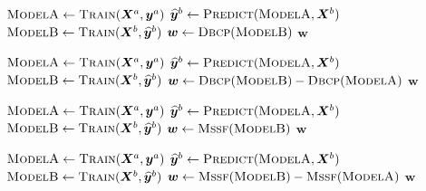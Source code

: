 \documentclass{article}
\begin{document}
\begin{algorithm}
	\caption{}
	\begin{algorithmic}[1]
		\State $\textsc{ModelA} \gets \Call{Train}{\bm{X}^a,\bm{y}^a}$
		\State $\widehat{\bm{y}}^b \gets \Call{Predict}{\textsc{ModelA},\bm{X}^b}$
		\State $\textsc{ModelB} \gets \Call{Train}{\bm{X}^b,\widehat{\bm{y}}^b}$
		\State $\bm{w} \gets \Call{Dbcp}{\textsc{ModelB}}$
		\State \Return $\bm{w}$
		\EndFunction
	\end{algorithmic}
\end{algorithm}

\begin{algorithm}
	\caption{}
	\begin{algorithmic}[1]
		\State $\textsc{ModelA} \gets \Call{Train}{\bm{X}^a,\bm{y}^a}$
		\State $\widehat{\bm{y}}^b \gets \Call{Predict}{\textsc{ModelA},\bm{X}^b}$
		\State $\textsc{ModelB} \gets \Call{Train}{\bm{X}^b,\widehat{\bm{y}}^b}$
		\State $\bm{w} \gets \Call{Dbcp}{\textsc{ModelB}} - \Call{Dbcp}{\textsc{ModelA}}$
		\State \Return $\bm{w}$
		\EndFunction
	\end{algorithmic}
\end{algorithm}

\begin{algorithm}
	\caption{}
	\begin{algorithmic}[1]
		\State $\textsc{ModelA} \gets \Call{Train}{\bm{X}^a,\bm{y}^a}$
		\State $\widehat{\bm{y}}^b \gets \Call{Predict}{\textsc{ModelA},\bm{X}^b}$
		\State $\textsc{ModelB} \gets \Call{Train}{\bm{X}^b,\widehat{\bm{y}}^b}$
		\State $\bm{w} \gets \Call{Mssf}{\textsc{ModelB}}$
		\State \Return $\bm{w}$
		\EndFunction
	\end{algorithmic}
\end{algorithm}

\begin{algorithm}
	\caption{}
	\begin{algorithmic}[1]
		\State $\textsc{ModelA} \gets \Call{Train}{\bm{X}^a,\bm{y}^a}$
		\State $\widehat{\bm{y}}^b \gets \Call{Predict}{\textsc{ModelA},\bm{X}^b}$
		\State $\textsc{ModelB} \gets \Call{Train}{\bm{X}^b,\widehat{\bm{y}}^b}$
		\State $\bm{w} \gets \Call{Mssf}{\textsc{ModelB}}-\Call{Mssf}{\textsc{ModelA}}$
		\State \Return $\bm{w}$
		\EndFunction
	\end{algorithmic}
\end{algorithm}
\end{document}
